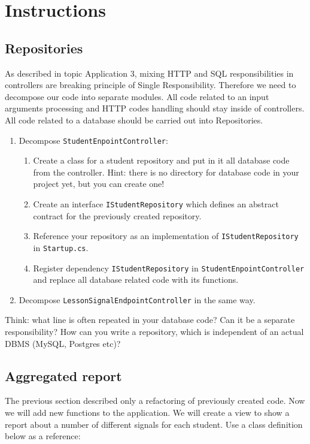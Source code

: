 \documentclass[12pt]{article}
\newcommand{\code}[1]{\texttt{#1}}
\begin{document}
\section*{Instructions}

\subsection*{Repositories}

As described in topic Application 3, mixing HTTP and SQL responsibilities in controllers are breaking principle of Single Responsibility. Therefore we need to decompose our code into separate modules. All code related to an input arguments processing and HTTP codes handling should stay inside of controllers. All code related to a database should be carried out into Repositories.

\begin{enumerate}
\item Decompose \code{StudentEnpointController}:
    \begin{enumerate}
    \item Create a class for a student repository and put in it all database code from the controller. Hint: there is no directory for database code in your project yet, but you can create one!
    \item Create an interface \code{IStudentRepository} which defines an abstract contract for the previously created repository.
    \item Reference your repository as an implementation of \code{IStudentRepository} in \code{Startup.cs}.
    \item Register dependency \code{IStudentRepository} in \code{StudentEnpointController} and replace all database related code with its functions.
    \end{enumerate}
\item Decompose \code{LessonSignalEndpointController} in the same way.
\end{enumerate}

Think: what line is often repeated in your database code? Can it be a separate responsibility? How can you write a repository, which is independent of an actual DBMS (MySQL, Postgres etc)?

\subsection*{Aggregated report}

The previous section described only a refactoring of previously created code. Now we will add new functions to the application. We will create a view to show a report about a number of different signals for each student. Use a class definition below as a reference:
\end{document}
